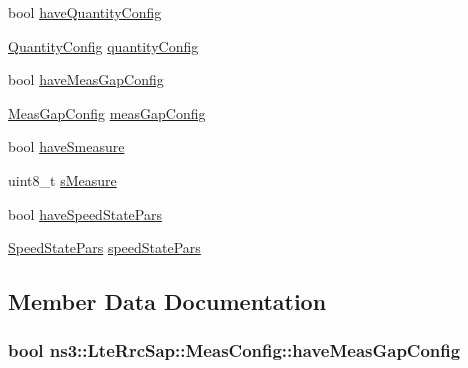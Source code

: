 \begin{DoxyCompactItemize}
\item 
bool \hyperlink{structns3_1_1LteRrcSap_1_1MeasConfig_aeb84564bf645eef57fa27943afa868a4}{have\+Quantity\+Config}
\item 
\hyperlink{structns3_1_1LteRrcSap_1_1QuantityConfig}{Quantity\+Config} \hyperlink{structns3_1_1LteRrcSap_1_1MeasConfig_aa896a8aa8ac1922552489338f0ad8cd5}{quantity\+Config}
\item 
bool \hyperlink{structns3_1_1LteRrcSap_1_1MeasConfig_a8909415c7b07c4b5feafed1bce00e97c}{have\+Meas\+Gap\+Config}
\item 
\hyperlink{structns3_1_1LteRrcSap_1_1MeasGapConfig}{Meas\+Gap\+Config} \hyperlink{structns3_1_1LteRrcSap_1_1MeasConfig_acb2f7bd38f768ecf15202bc23c65bda0}{meas\+Gap\+Config}
\item 
bool \hyperlink{structns3_1_1LteRrcSap_1_1MeasConfig_aaa9876e139cd41b400edbf5178fecfa9}{have\+Smeasure}
\item 
uint8\+\_\+t \hyperlink{structns3_1_1LteRrcSap_1_1MeasConfig_a069a243a34330262a0c0ec6818d07965}{s\+Measure}
\item 
bool \hyperlink{structns3_1_1LteRrcSap_1_1MeasConfig_aabf400c6da90071d7f1693e357511efc}{have\+Speed\+State\+Pars}
\item 
\hyperlink{structns3_1_1LteRrcSap_1_1SpeedStatePars}{Speed\+State\+Pars} \hyperlink{structns3_1_1LteRrcSap_1_1MeasConfig_a7ed0531b9220a0404bb928f867baa049}{speed\+State\+Pars}
\end{DoxyCompactItemize}


\subsection{Member Data Documentation}
\subsubsection[{\texorpdfstring{have\+Meas\+Gap\+Config}{haveMeasGapConfig}}]{\setlength{\rightskip}{0pt plus 5cm}bool ns3\+::\+Lte\+Rrc\+Sap\+::\+Meas\+Config\+::have\+Meas\+Gap\+Config}\hypertarget{structns3_1_1LteRrcSap_1_1MeasConfig_a8909415c7b07c4b5feafed1bce00e97c}{}\label{structns3_1_1LteRrcSap_1_1MeasConfig_a8909415c7b07c4b5feafed1bce00e97c}
